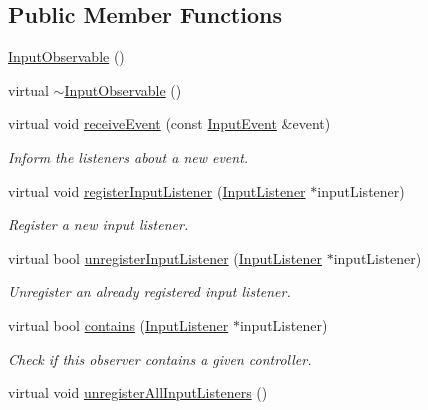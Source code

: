 \subsection*{Public Member Functions}
\begin{DoxyCompactItemize}
\item 
\mbox{\hyperlink{classec_1_1_input_observable_a92422814189d1210f631f4d1378877f3}{Input\+Observable}} ()
\item 
virtual \mbox{\hyperlink{classec_1_1_input_observable_ac261f6a73cfdcd37c276e732cc25f869}{$\sim$\+Input\+Observable}} ()
\item 
virtual void \mbox{\hyperlink{classec_1_1_input_observable_ac35d29f643a2735e4cb38cb6ee1354aa}{receive\+Event}} (const \mbox{\hyperlink{structec_1_1_input_event}{Input\+Event}} \&event)
\begin{DoxyCompactList}\small\item\em Inform the listeners about a new event. \end{DoxyCompactList}\item 
virtual void \mbox{\hyperlink{classec_1_1_input_observable_a542bd14ecfbeceed917ea0df5c7f3755}{register\+Input\+Listener}} (\mbox{\hyperlink{classec_1_1_input_listener}{Input\+Listener}} $\ast$input\+Listener)
\begin{DoxyCompactList}\small\item\em Register a new input listener. \end{DoxyCompactList}\item 
virtual bool \mbox{\hyperlink{classec_1_1_input_observable_aab1af4952f6127781eade6dccf33aafb}{unregister\+Input\+Listener}} (\mbox{\hyperlink{classec_1_1_input_listener}{Input\+Listener}} $\ast$input\+Listener)
\begin{DoxyCompactList}\small\item\em Unregister an already registered input listener. \end{DoxyCompactList}\item 
virtual bool \mbox{\hyperlink{classec_1_1_input_observable_a6e14f68359b8d7e1be60e8503a07ea87}{contains}} (\mbox{\hyperlink{classec_1_1_input_listener}{Input\+Listener}} $\ast$input\+Listener)
\begin{DoxyCompactList}\small\item\em Check if this observer contains a given controller. \end{DoxyCompactList}\item 
virtual void \mbox{\hyperlink{classec_1_1_input_observable_ac8d3ed43a3b26601e2710e3758248620}{unregister\+All\+Input\+Listeners}} ()

\end{DoxyCompactItemize}
